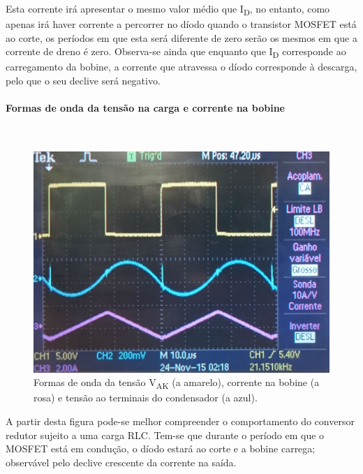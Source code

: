 \documentclass[a4paper,11pt]{article}
\numberwithin{equation}{section}
\begin{document}
Esta corrente irá apresentar o mesmo valor médio que I\textsubscript{D}, no entanto, como apenas irá haver corrente a percorrer no díodo quando o transistor MOSFET está ao corte, os períodos em que esta será diferente de zero serão os mesmos em que a corrente de dreno é zero. Observa-se ainda que enquanto que I\textsubscript{D} corresponde ao carregamento da bobine, a corrente que atravessa o díodo corresponde à descarga, pelo que o seu declive será negativo.

\pagebreak

\paragraph{Formas de onda da tensão na carga e corrente na bobine}\mbox{}\

\begin{figure}[H]
	\centering
	\includegraphics[keepaspectratio=true, scale=0.15]{img/figs/tensao_carga_corrente_bobine_ac_rlcbuck}
	\caption{Formas de onda da tensão V\textsubscript{AK} (a amarelo), corrente na bobine (a rosa) e tensão ao terminais do condensador (a azul).}
	\label{fig:tensao_carga_corrente_bobine_ac_rlcbuck}
	\vspace{-0.8em}
\end{figure} 


A partir desta figura pode-se melhor compreender o comportamento do conversor redutor sujeito a uma carga RLC. Tem-se que durante o período em que o MOSFET está em condução, o díodo estará ao corte e a bobine carrega; observável pelo declive crescente da corrente na saída. 
\end{document}
